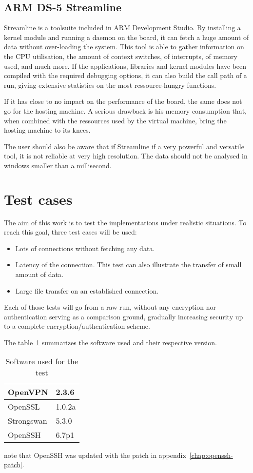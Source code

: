 \subsection{ARM DS-5 Streamline}
Streamline is a toolsuite included in ARM Development Studio.
By installing a kernel module and running a daemon on the board, it can fetch a huge amount of data without over-loading the system.
This tool is able to gather information on the CPU utilisation, the amount of context switches, of interrupts, of memory used, and much more.
If the applications, libraries and kernel modules have been compiled with the required debugging options, it can also build the call path of a run, giving extensive statistics on the most ressource-hungry functions.

If it has close to no impact on the performance of the board, the same does not go for the hosting machine.
A serious drawback is his memory consumption that, when combined with the ressources used by the virtual machine, bring the hosting machine to its knees.

\noindent The user should also be aware that if Streamline if a very powerful and versatile tool, it is not reliable at very high resolution.
The data should not be analysed in windows smaller than a millisecond.

\section{Test cases}
The aim of this work is to test the implementations under realistic situations.
To reach this goal, three test cases will be used:
\begin{itemize}
	\item Lots of connections without fetching any data.
	\item Latency of the connection. This test can also illustrate the transfer of small amount of data.
	\item Large file transfer on an established connection.
\end{itemize}

Each of those tests will go from a raw run, without any encryption nor authentication serving as a comparison ground, gradually increasing security up to a complete encryption/authentication scheme.

The table~\ref{tab:software-version} summarizes the software used and their respective version.

\begin{table}
\center
\begin{tabular}{|l|l|} \hline
OpenVPN & 2.3.6 \\ \hline
OpenSSL & 1.0.2a \\ \hline
Strongswan & 5.3.0 \\ \hline
OpenSSH & 6.7p1 \\ \hline
\end{tabular}
\caption{Software used for the test}{note that OpenSSH was updated with the patch in appendix~\ref{chap:openssh-patch}.}
\label{tab:software-version}
\end{table}

